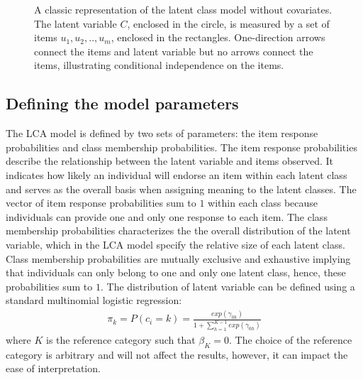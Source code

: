 \begin{figure}[h!]
\centering
\caption{A classic representation of the latent class model without covariates. The latent variable $C$, enclosed in the circle, is measured by a set of items $u_{1},u_{2},..,u_{m}$, enclosed in the rectangles. One-direction arrows connect the items and latent variable but no arrows connect the items, illustrating conditional independence on the items.}\label{fig2.1}
\end{figure}

\subsection{Defining the model parameters}
The LCA model is defined by two sets of parameters: the item response probabilities and class membership probabilities. The item response probabilities describe the relationship between the latent variable and items observed. It indicates how likely an individual will endorse an item within each latent class and serves as the overall basis when assigning meaning to the latent classes. The vector of item response probabilities sum to $1$ within each class because individuals can provide one and only one response to each item. The class membership probabilities characterizes the the overall distribution of the latent variable, which in the LCA model specify the relative size of each latent class. Class membership probabilities are mutually exclusive and exhaustive implying that individuals can only belong to one and only one latent class, hence, these probabilities sum to $1$. The distribution of latent variable can be defined using a standard multinomial logistic regression: 
\begin{align}
    \pi_{k} = P(c_{i}=k) = \frac{exp(\gamma_{0k})}{1 + \sum_{h=1}^{K-1}exp(\gamma_{0h})}
\end{align} where $K$ is the reference category such that $\beta_{K}=0$. The choice of the reference category is arbitrary and will not affect the results, however, it can impact the ease of interpretation. 

